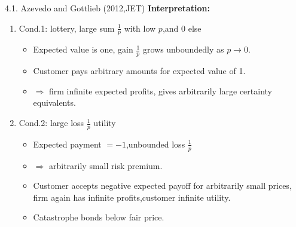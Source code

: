 \documentclass[11pt,aspectratio=169]{beamer}
\begin{document}
\begin{frame}{4.1. Azevedo and Gottlieb (2012,JET)}
\textbf{Interpretation:}
\begin{enumerate}[(1)]
    \item Cond.1: lottery, large sum $\frac{1}{p}$ with low $p$,and $0$ else\\
    \begin{itemize}
        \item Expected value is one, gain $\frac{1}{p}$ grows unboundedly as $p \rightarrow 0$.\\
        \item     Customer pays arbitrary amounts for expected value of 1. \medskip
        \item $\Rightarrow$ firm infinite expected profits, gives arbitrarily large certainty equivalents. \medskip
    \end{itemize}
    \item Cond.2: large loss $\frac{1}{p}$ utility\\
    \begin{itemize}
        \item Expected payment $=-1$,unbounded loss $\frac{1}{p}$\medskip
        \item $\Rightarrow$ arbitrarily small risk premium. \medskip
        \item Customer accepts negative expected payoff for arbitrarily small prices, firm again has infinite profits,customer infinite utility.\\
        \item Catastrophe bonds below fair price.
    \end{itemize}
\end{enumerate}
\end{frame}
\end{document}
